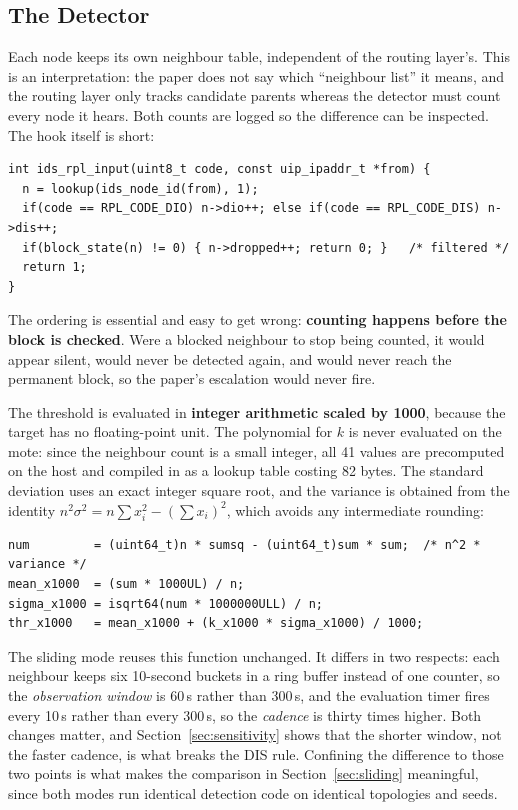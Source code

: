 \documentclass[11pt, a4paper]{article}
\begin{document}
\subsection{The Detector}

Each node keeps its own neighbour table, independent of the routing layer's. This is an interpretation: the paper does not say which ``neighbour list'' it means, and the routing layer only tracks candidate parents whereas the detector must count every node it hears. Both counts are logged so the difference can be inspected. The hook itself is short:

\begin{lstlisting}
int ids_rpl_input(uint8_t code, const uip_ipaddr_t *from) {
  n = lookup(ids_node_id(from), 1);
  if(code == RPL_CODE_DIO) n->dio++; else if(code == RPL_CODE_DIS) n->dis++;
  if(block_state(n) != 0) { n->dropped++; return 0; }   /* filtered */
  return 1;
}
\end{lstlisting}

The ordering is essential and easy to get wrong: \textbf{counting happens before the block is checked}. Were a blocked neighbour to stop being counted, it would appear silent, would never be detected again, and would never reach the permanent block, so the paper's escalation would never fire.

The threshold is evaluated in \textbf{integer arithmetic scaled by 1000}, because the target has no floating-point unit. The polynomial for $k$ is never evaluated on the mote: since the neighbour count is a small integer, all 41 values are precomputed on the host and compiled in as a lookup table costing 82 bytes. The standard deviation uses an exact integer square root, and the variance is obtained from the identity $n^2\sigma^2 = n\sum x_i^2 - (\sum x_i)^2$, which avoids any intermediate rounding:

\begin{lstlisting}
num         = (uint64_t)n * sumsq - (uint64_t)sum * sum;  /* n^2 * variance */
mean_x1000  = (sum * 1000UL) / n;
sigma_x1000 = isqrt64(num * 1000000ULL) / n;
thr_x1000   = mean_x1000 + (k_x1000 * sigma_x1000) / 1000;
\end{lstlisting}

The sliding mode reuses this function unchanged. It differs in two respects: each neighbour keeps six 10-second buckets in a ring buffer instead of one counter, so the \textit{observation window} is 60\,s rather than 300\,s, and the evaluation timer fires every 10\,s rather than every 300\,s, so the \textit{cadence} is thirty times higher. Both changes matter, and Section~\ref{sec:sensitivity} shows that the shorter window, not the faster cadence, is what breaks the DIS rule. Confining the difference to those two points is what makes the comparison in Section~\ref{sec:sliding} meaningful, since both modes run identical detection code on identical topologies and seeds.
\end{document}
